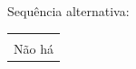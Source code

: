 Sequência alternativa:
\begin{table}[H]
    \centering
    \begin{tabular}{|p{15cm}|}
        \hline\\
            Não há\\
        \hline
    \end{tabular}
\end{table}












